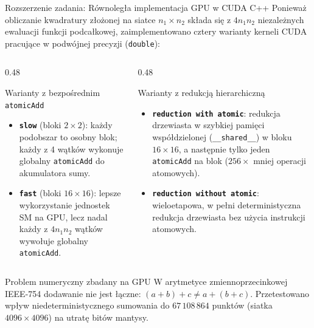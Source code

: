 \documentclass[aspectratio=169, 10pt, xcolor={table}]{beamer}
\begin{document}
\begin{frame}{Rozszerzenie zadania: Równoległa implementacja GPU w CUDA C++}
  Ponieważ obliczanie kwadratury złożonej na siatce $n_1 \times n_2$ składa się z $4 n_1 n_2$ niezależnych ewaluacji funkcji podcałkowej, zaimplementowano cztery warianty kerneli CUDA pracujące w podwójnej precyzji (\texttt{double}):

  \vspace{0.15cm}
  \begin{columns}[T]
    \begin{column}{0.48\textwidth}
      \begin{block}{Warianty z bezpośrednim \texttt{atomicAdd}}
        \begin{itemize}
          \item \textbf{\texttt{slow}} (bloki $2 \times 2$): każdy podobszar to osobny blok; każdy z 4 wątków wykonuje globalny \texttt{atomicAdd} do akumulatora sumy.
          \item \textbf{\texttt{fast}} (bloki $16 \times 16$): lepsze wykorzystanie jednostek SM na GPU, lecz nadal każdy z $4 n_1 n_2$ wątków wywołuje globalny \texttt{atomicAdd}.
        \end{itemize}
      \end{block}
    \end{column}
    \begin{column}{0.48\textwidth}
      \begin{exampleblock}{Warianty z redukcją hierarchiczną}
        \begin{itemize}
          \item \textbf{\texttt{reduction with atomic}}: redukcja drzewiasta w szybkiej pamięci współdzielonej (\texttt{\_\_shared\_\_}) w bloku $16 \times 16$, a następnie tylko jeden \texttt{atomicAdd} na blok ($256\times$ mniej operacji atomowych).
          \item \textbf{\texttt{reduction without atomic}}: wieloetapowa, w pełni deterministyczna redukcja drzewiasta bez użycia instrukcji atomowych.
        \end{itemize}
      \end{exampleblock}
    \end{column}
  \end{columns}

  \vspace{0.15cm}
  \begin{alertblock}{Problem numeryczny zbadany na GPU}
    W arytmetyce zmiennoprzecinkowej IEEE-754 dodawanie nie jest łączne: $(a+b)+c \neq a+(b+c)$. Przetestowano wpływ niedeterministycznego sumowania do $67\,108\,864$ punktów (siatka $4096 \times 4096$) na utratę bitów mantysy.
  \end{alertblock}
\end{frame}
\end{document}

